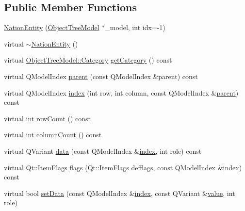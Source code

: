 \subsection*{Public Member Functions}
\begin{DoxyCompactItemize}
\item 
\mbox{\hyperlink{classobjecttree_1_1_nation_entity_af9514ad070207f89e2432e97922f7eb5}{Nation\+Entity}} (\mbox{\hyperlink{class_object_tree_model}{Object\+Tree\+Model}} $\ast$\+\_\+model, int idx=-\/1)
\item 
virtual \mbox{\hyperlink{classobjecttree_1_1_nation_entity_a505e10f5ac2067546d9ab54f7266fc51}{$\sim$\+Nation\+Entity}} ()
\item 
virtual \mbox{\hyperlink{class_object_tree_model_a379e9d6b0d381853785adf62095ba4e3}{Object\+Tree\+Model\+::\+Category}} \mbox{\hyperlink{classobjecttree_1_1_nation_entity_aade68d7d80fda8f3bff7e01236299c4c}{get\+Category}} () const
\item 
virtual Q\+Model\+Index \mbox{\hyperlink{classobjecttree_1_1_nation_entity_a8d234e253f9fee34e9914f211ca07345}{parent}} (const Q\+Model\+Index \&parent) const
\item 
virtual Q\+Model\+Index \mbox{\hyperlink{classobjecttree_1_1_nation_entity_a29d4f8e8200a1573413da0695313bdc2}{index}} (int row, int column, const Q\+Model\+Index \&\mbox{\hyperlink{classobjecttree_1_1_nation_entity_a8d234e253f9fee34e9914f211ca07345}{parent}}) const
\item 
virtual int \mbox{\hyperlink{classobjecttree_1_1_nation_entity_ad7eee2c49a533376829241e4477c8d9d}{row\+Count}} () const
\item 
virtual int \mbox{\hyperlink{classobjecttree_1_1_nation_entity_a74de0ff70ca6d42223cdd036b14b8fbc}{column\+Count}} () const
\item 
virtual Q\+Variant \mbox{\hyperlink{classobjecttree_1_1_nation_entity_a610cb021fcba0d5bd48b52a70a44c128}{data}} (const Q\+Model\+Index \&\mbox{\hyperlink{classobjecttree_1_1_nation_entity_a29d4f8e8200a1573413da0695313bdc2}{index}}, int role) const
\item 
virtual Qt\+::\+Item\+Flags \mbox{\hyperlink{classobjecttree_1_1_nation_entity_acddd457619500a3bfbb983ece060e487}{flags}} (Qt\+::\+Item\+Flags defflags, const Q\+Model\+Index \&\mbox{\hyperlink{classobjecttree_1_1_nation_entity_a29d4f8e8200a1573413da0695313bdc2}{index}}) const
\item 
virtual bool \mbox{\hyperlink{classobjecttree_1_1_nation_entity_a0021c25f09f403b8d9b1f3366f08d7f8}{set\+Data}} (const Q\+Model\+Index \&\mbox{\hyperlink{classobjecttree_1_1_nation_entity_a29d4f8e8200a1573413da0695313bdc2}{index}}, const Q\+Variant \&\mbox{\hyperlink{diffusion_8cpp_a4b41795815d9f3d03abfc739e666d5da}{value}}, int role)
\end{DoxyCompactItemize}
